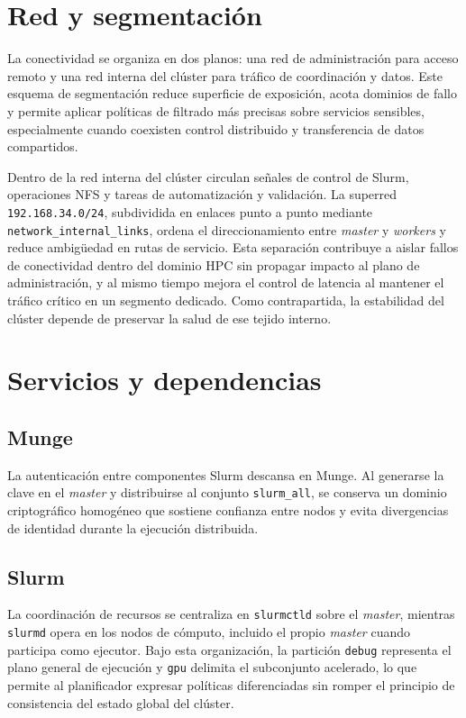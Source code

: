 \section{Red y segmentación}
\label{sec:arq_red_segmentacion}

La conectividad se organiza en dos planos: una red de administración para acceso remoto y una red interna del clúster para tráfico de coordinación y datos. Este esquema de segmentación reduce superficie de exposición, acota dominios de fallo y permite aplicar políticas de filtrado más precisas sobre servicios sensibles, especialmente cuando coexisten control distribuido y transferencia de datos compartidos.

Dentro de la red interna del clúster circulan señales de control de Slurm, operaciones NFS y tareas de automatización y validación. La superred \texttt{192.168.34.0/24}, subdividida en enlaces punto a punto mediante \texttt{network\_internal\_links}, ordena el direccionamiento entre \textit{master} y \textit{workers} y reduce ambigüedad en rutas de servicio. Esta separación contribuye a aislar fallos de conectividad dentro del dominio HPC sin propagar impacto al plano de administración, y al mismo tiempo mejora el control de latencia al mantener el tráfico crítico en un segmento dedicado. Como contrapartida, la estabilidad del clúster depende de preservar la salud de ese tejido interno.

\section{Servicios y dependencias}
\label{sec:arq_servicios_dependencias}

\subsection{Munge}
\label{subsec:arq_munge}

La autenticación entre componentes Slurm descansa en Munge. Al generarse la clave en el \textit{master} y distribuirse al conjunto \texttt{slurm\_all}, se conserva un dominio criptográfico homogéneo que sostiene confianza entre nodos y evita divergencias de identidad durante la ejecución distribuida.

\subsection{Slurm}
\label{subsec:arq_slurm}

La coordinación de recursos se centraliza en \texttt{slurmctld} sobre el \textit{master}, mientras \texttt{slurmd} opera en los nodos de cómputo, incluido el propio \textit{master} cuando participa como ejecutor. Bajo esta organización, la partición \texttt{debug} representa el plano general de ejecución y \texttt{gpu} delimita el subconjunto acelerado, lo que permite al planificador expresar políticas diferenciadas sin romper el principio de consistencia del estado global del clúster.

